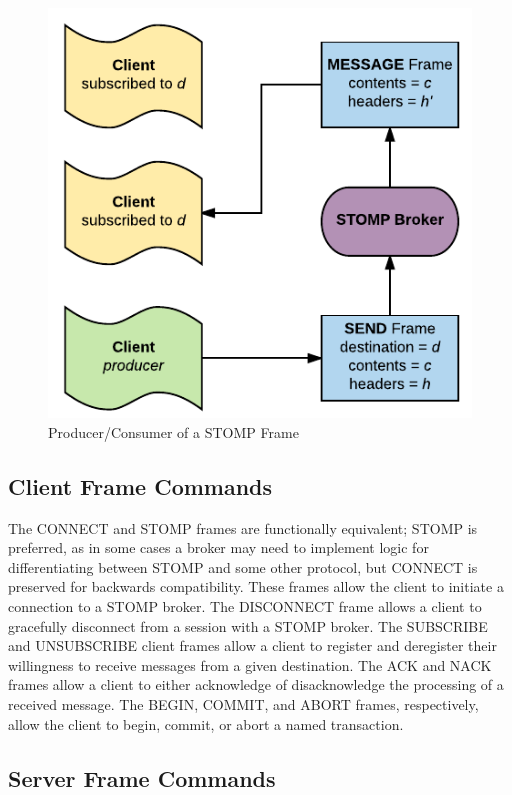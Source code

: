 \documentclass[conference, letterpaper]{IEEEtran}
\begin{document}
   \begin{figure}[h]
        \centering
        \ifCLASSINFOpdf
             \includegraphics[scale=.75]{send.pdf}
         \else
        \fi
        \caption{Producer/Consumer of a STOMP Frame}
        \label{stompsend}
    \end{figure}


\subsection{Client Frame Commands}

The CONNECT and STOMP frames are functionally equivalent; STOMP is preferred, as in some cases a broker may need to implement logic for differentiating between STOMP and some other protocol, but CONNECT is preserved for backwards compatibility. These frames allow the client to initiate a connection to a STOMP broker. The DISCONNECT frame allows a client to gracefully disconnect from a session with a STOMP broker. The SUBSCRIBE and UNSUBSCRIBE client frames allow a client to register and deregister their willingness to receive messages from a given destination. The ACK and NACK frames allow a client to either acknowledge of disacknowledge the processing of a received message. The BEGIN, COMMIT, and ABORT frames, respectively, allow the client to begin, commit, or abort a named transaction.

\subsection{Server Frame Commands}
\end{document}
